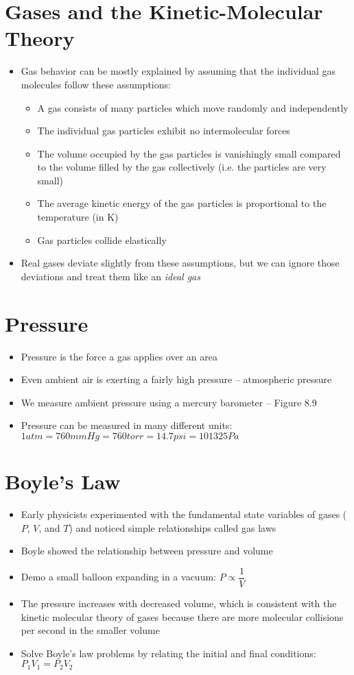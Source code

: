 \documentclass[12pt, openany, letterpaper]{memoir}
\begin{document}
\section{Gases and the Kinetic-Molecular Theory}
\begin{itemize}
	\item Gas behavior can be mostly explained by assuming that the individual gas molecules follow these assumptions:
	\begin{itemize}
		\item A gas consists of many particles which move randomly and independently
		\item The individual gas particles exhibit no intermolecular forces
		\item The volume occupied by the gas particles is vanishingly small compared to the volume filled by the gas collectively (i.e. the particles are very small)
		\item The average kinetic energy of the gas particles is proportional to the temperature (in K)
		\item Gas particles collide elastically		
	\end{itemize}
	\item Real gases deviate slightly from these assumptions, but we can ignore those deviations and treat them like an \emph{ideal gas}
\end{itemize}
\section{Pressure}
\begin{itemize}
	\item Pressure is the force a gas applies over an area
	\item Even ambient air is exerting a fairly high pressure -- atmospheric pressure
	\item We measure ambient pressure using a mercury barometer -- Figure 8.9
	\item Pressure can be measured in many different units: $1atm=760mmHg=760torr=14.7psi=101325Pa$
\end{itemize}
\section{Boyle's Law}
\begin{itemize}
	\item Early physicists experimented with the fundamental state variables of gases ($P$, $V$, and $T$) and noticed simple relationships called gas laws
	\item Boyle showed the relationship between pressure and volume
	\item Demo a small balloon expanding in a vacuum: $P\propto \dfrac{1}{V}$
	\item The pressure increases with decreased volume, which is consistent with the kinetic molecular theory of gases because there are more molecular collisions per second in the smaller volume
	\item Solve Boyle's law problems by relating the initial and final conditions: $P_1V_1=P_2V_2$
\end{itemize}
\end{document}
